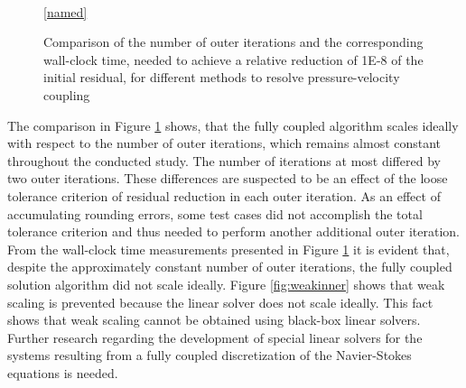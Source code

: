 \begin{figure}[h!]
  \begin{center}
    \\
  \ref{named}
  \end{center}
  \caption{Comparison of the number of outer iterations and the corresponding wall-clock time, needed to achieve a relative reduction of 1E-8 of the initial residual, for different methods to resolve pressure-velocity coupling}
  \label{fig:weak}
\end{figure}

The comparison in Figure \ref{fig:weak} shows, that the fully coupled algorithm scales ideally with respect to the number of outer iterations, which remains almost constant throughout the conducted study. The number of iterations at most differed by two outer iterations. These differences are suspected to be an effect of the loose tolerance criterion of residual reduction in each outer iteration. As an effect of accumulating rounding errors, some test cases did not accomplish the total tolerance criterion and thus needed to perform another additional outer iteration. From the wall-clock time measurements presented in Figure \ref{fig:weak} it is evident that, despite the approximately constant number of outer iterations, the fully coupled solution algorithm did not scale ideally. Figure \ref{fig:weakinner} shows that weak scaling is prevented because the linear solver does not scale ideally. This fact shows that weak scaling cannot be obtained using black-box linear solvers. Further research regarding the development of special linear solvers for the systems resulting from a fully coupled discretization of the Navier-Stokes equations is needed.

